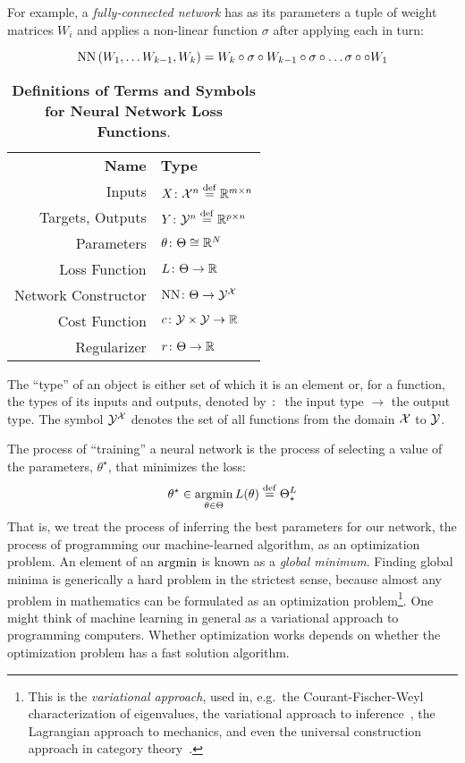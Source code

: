 \documentclass[../../thesis.tex]{subfiles}
\begin{document}
For example,
a \emph{fully-connected network}
has as its parameters a tuple of weight matrices $W_i$
and applies a non-linear function $\sigma$
after applying each in turn:

\begin{equation}
	\mathrm{NN}\left(W_1, \dots W_{k-1}, W_k\right) = W_k \circ \sigma \circ W_{k-1} \circ \sigma \circ \dots \sigma \circ \circ W_1
\end{equation}

\begin{table}[h]
	\begin{center}
		\begin{tabular}{rl}
			\textbf{Name}       & \textbf{Type}                          \\
			Inputs              & $X \colon {\mathcal{X}}^n \stackrel{\small \mathrm{def}}{=} \mathbb{R}^{m\times n}$  \\
			Targets, Outputs    & $Y \colon {\mathcal{Y}}^n \stackrel{\small \mathrm{def}}{=} \mathbb{R}^{p\times n}$  \\
			Parameters          & $\theta \colon \Theta \cong \mathbb{R}^N$        \\
			Loss Function       & $L \colon \Theta \to \mathbb{R}$                \\
			Network Constructor & $\mathrm{NN} \colon \Theta \to {\mathcal{Y}}^{\mathcal{X}}$ \\
			Cost Function       & $c \colon {\mathcal{Y}} \times {\mathcal{Y}} \to \mathbb{R}$        \\
			Regularizer         & $r \colon \Theta \to \mathbb{R}$
		\end{tabular}
	\end{center}
	\caption{\textbf{Definitions of Terms and Symbols for Neural Network Loss Functions}.}{%
		The \enquote{type} of an object is either set of which it is an element
		or, for a function, the types of its inputs and outputs,
		denoted by $\colon$ the input type $\to$ the output type.
		The symbol ${\mathcal{Y}}^{{\mathcal{X}}}$
		denotes the set of all functions from the domain ${\mathcal{X}}$ to ${\mathcal{Y}}$.
	}
\end{table}

The process of \enquote{training} a neural network is the process
of selecting a value of the parameters, $\theta^\star$, that minimizes the loss:
\begin{equation}\equationlabel{minimize}
	\theta^\star \in \argmin_{\theta \in \Theta} L(\theta) \defeq \Theta^L_{\star}
\end{equation}
That is, we treat the process of inferring the best parameters for our network,
the process of programming our machine-learned algorithm,
as an optimization problem.
An element of an $\mathop{\mathrm{argmin}}$ is known as a \emph{global minimum}.
Finding global minima is generically a hard problem in the strictest sense,
because almost any problem in mathematics can be formulated as an
optimization problem\footnote{This is the \emph{variational approach},
used in, e.g.~the Courant-Fischer-Weyl characterization of eigenvalues,
the variational approach to inference~\cite{wainwright2007},
the Lagrangian approach to mechanics,
and even the universal construction approach in category theory~\cite{milewski2014}.
}.
One might think of machine learning in general as
a variational approach to programming computers.
Whether optimization works
depends on whether the optimization problem
has a fast solution algorithm.
\end{document}
